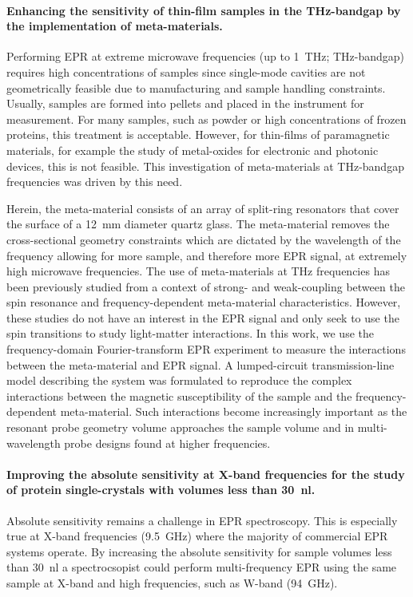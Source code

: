 \hspace{1em}
\paragraph*{Enhancing the sensitivity of thin-film samples in the THz-bandgap by the implementation of meta-materials.}
Performing EPR at extreme microwave frequencies (up to 1~THz; THz-bandgap) requires high concentrations of samples since single-mode cavities are not geometrically feasible due to manufacturing and sample handling constraints. Usually, samples are formed into pellets and placed in the instrument for measurement. \cite{NEHRKORN201710} For many samples, such as powder or high concentrations of frozen proteins, this treatment is acceptable. However, for thin-films of paramagnetic materials, for example the study of metal-oxides for electronic and photonic devices, this is not feasible. \cite{oxidesurface} This investigation of meta-materials at THz-bandgap frequencies was driven by this need.

Herein, the meta-material consists of an array of split-ring resonators that cover the surface of a 12~mm diameter quartz glass. The meta-material removes the cross-sectional geometry constraints which are dictated by the wavelength of the frequency allowing for more sample, and therefore more EPR signal, at extremely high microwave frequencies. The use of meta-materials at THz frequencies has been previously studied from a context of strong- and weak-coupling between the spin resonance and frequency-dependent meta-material characteristics.\cite{SchneiderEPR,BOERO2013133,Scalari1323} However, these studies do not have an interest in the EPR signal and only seek to use the spin transitions to study light-matter interactions. In this work, we use the frequency-domain Fourier-transform EPR experiment to measure the interactions between the meta-material and EPR signal. A lumped-circuit transmission-line model describing the system was formulated to reproduce the complex interactions between the magnetic susceptibility of the sample and the frequency-dependent meta-material. Such interactions become increasingly important as the resonant probe geometry volume approaches the sample volume and in multi-wavelength probe designs found at higher frequencies. \cite{grinbergVHF}

\hspace{1em}
\paragraph{Improving the absolute sensitivity at X-band frequencies for the study of protein single-crystals with volumes less than 30~nl.}
Absolute sensitivity remains a challenge in EPR spectroscopy. This is especially true at X-band frequencies (9.5~GHz) where the majority of commercial EPR systems operate. By increasing the absolute sensitivity for sample volumes less than 30~nl a spectrocsopist could perform multi-frequency EPR using the same sample at X-band and high frequencies, such as W-band (94~GHz). 

